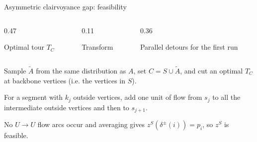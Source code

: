 \documentclass[aspectratio=169,12pt]{beamer}
\begin{document}
\begin{frame}{Asymmetric clairvoyance gap: feasibility}
  \begin{columns}[c,onlytextwidth]
    \begin{column}{0.47\textwidth}
      \centering
      {\footnotesize\textcolor{ThBlue}{Optimal tour \(T_C\)}\par}
      \smallskip
      \resizebox{0.89\linewidth}{!}{\ThLongestRunWitness}
    \end{column}
    \begin{column}{0.11\textwidth}
      \centering
      {\footnotesize\textcolor{ThInkSoft}{Transform}\par}
      \ThTransformArrow
    \end{column}
    \begin{column}{0.36\textwidth}
      \centering
      {\footnotesize\textcolor{ThTeal}{Parallel detours for the first run}\par}
      \smallskip
      \resizebox{0.89\linewidth}{!}{\ThParallelDetours}
    \end{column}
  \end{columns}

  {\normalfont\footnotesize
    Sample \(\widetilde A\) from the same distribution as $A$,  set \(C=S\cup\widetilde A\), and cut an optimal
    \(T_C\) at backbone vertices (i.e. the vertices in $S$). 

    For a segment with \(k_j\) outside vertices, add one unit of flow 
    from $s_j$ to all the intermediate outside vertices and then to $s_{j+1}$.
  }


  {\normalfont\footnotesize
    No \(U\to U\) flow arcs occur and averaging gives
    \(z^S(\delta^\pm(i))=p_i\), so \(z^S\) is feasible.
  }
\end{frame}
\end{document}
